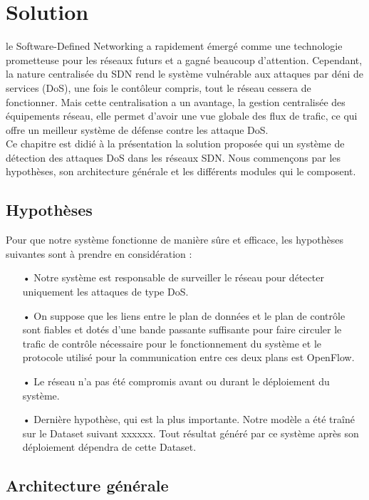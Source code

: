\chapter{Solution}

\label{Chapter4} 
le Software-Defined Networking a rapidement émergé comme une technologie prometteuse pour les réseaux futurs et a gagné beaucoup d'attention. Cependant, la nature centralisée du SDN rend le système vulnérable aux attaques par déni de services (DoS), une fois le contôleur compris, tout le réseau cessera de fonctionner. Mais cette centralisation a un avantage, la gestion centralisée des équipements réseau, elle permet d'avoir une vue globale des flux de trafic, ce qui offre un meilleur système de défense contre les attaque DoS.\\

Ce chapitre est didié à la présentation la solution proposée qui un système de détection des attaques DoS dans les réseaux SDN. Nous commençons par les hypothèses, son architecture générale et les différents modules qui le composent.

\section{Hypothèses}
Pour que notre système fonctionne de manière sûre et efficace, les hypothèses suivantes sont à prendre en considération :\\
\begin{itemize}
\item[•] Notre système est responsable de surveiller le réseau pour détecter uniquement les attaques de type DoS.\\
\item[•] On suppose que les liens entre le plan de données et le plan de contrôle sont fiables et dotés d’une bande passante suffisante pour faire circuler le trafic de contrôle nécessaire pour le fonctionnement du système et le protocole utilisé pour la communication entre ces deux plans est OpenFlow.\\
\item[•] Le réseau n’a pas été compromis avant ou durant le déploiement du système.\\
\item[•] Dernière hypothèse, qui est la plus importante. Notre modèle a été traîné sur le Dataset suivant xxxxxx. Tout résultat généré par ce système après son déploiement dépendra de cette Dataset.
\end{itemize}

\section{Architecture générale}


 